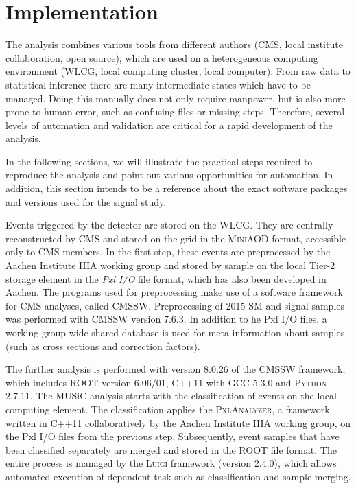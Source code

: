 \section{Implementation}
The analysis combines various tools from different authors (\ac{CMS}, local institute collaboration, open source), which are used on a heterogeneous computing environment (\ac{WLCG}, local computing cluster, local computer). From raw data to statistical inference there are many intermediate states which have to be managed. Doing this manually does not only require manpower, but is also more prone to human error, such as confusing files or missing steps. Therefore, several levels of automation and validation are critical for a rapid development of the analysis.

In the following sections, we will illustrate the practical steps required to reproduce the analysis and point out various opportunities for automation. In addition, this section intends to be a reference about the exact software packages and versions used for the signal study.

Events triggered by the detector are stored on the \ac{WLCG}. They are centrally reconstructed by \ac{CMS} and stored on the grid in the \textsc{MiniAOD} format, accessible only to \ac{CMS} members. In the first step, these events are preprocessed by the Aachen Institute IIIA working group and stored by sample on the local Tier-2 storage element in the \emph{Pxl I/O} file format\cite{Bretz:DevelopmentEnvironmentVisual}, which has also been developed in Aachen. The programs used for preprocessing make use of a software framework for \ac{CMS} analyses, called \textsc{CMSSW}. Preprocessing of 2015 \ac{SM} and signal samples was performed with \textsc{CMSSW} version 7.6.3. In addition to he Pxl I/O files, a working-group wide shared database is used for meta-information about samples (such as cross sections and correction factors).

The further analysis is performed with version 8.0.26 of the \textsc{CMSSW} framework, which includes \textsc{ROOT} version 6.06/01\cite{Brun:ROOTobjectoriented}, C++11 with \textsc{GCC} 5.3.0 and \textsc{Python} 2.7.11\cite{Oliphant:PythonScientificComputing}.
The \ac{MUSiC} analysis starts with the classification of events on the local computing element. The classification applies the \textsc{PxlAnalyzer}, a framework written in C++11 collaboratively by the Aachen Institute IIIA working group, on the Pxl I/O files from the previous step. Subsequently, event samples that have been classified separately are merged and stored in the \textsc{ROOT} file format. The entire process is managed by the \textsc{Luigi} framework \cite{Spotify:Luigi}(version 2.4.0), which allows automated execution of dependent task such as classification and sample merging.

